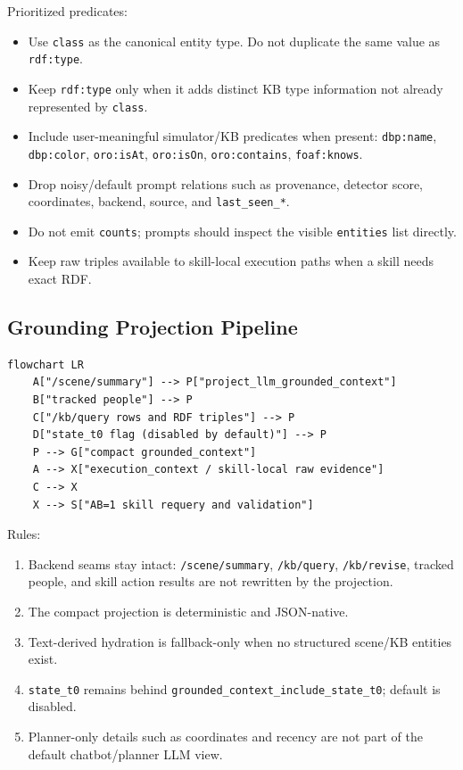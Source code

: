 \documentclass[12pt,a4paper]{article}
\newcommand{\code}[1]{\texttt{#1}}
\begin{document}
Prioritized predicates:

\begin{itemize}
\item Use \code{class} as the canonical entity type. Do not duplicate the same value as \code{rdf:type}.
\item Keep \code{rdf:type} only when it adds distinct KB type information not already represented by \code{class}.
\item Include user-meaningful simulator/KB predicates when present: \code{dbp:name}, \code{dbp:color}, \code{oro:isAt}, \code{oro:isOn}, \code{oro:contains}, \code{foaf:knows}.
\item Drop noisy/default prompt relations such as provenance, detector score, coordinates, backend, source, and \code{last\_seen\_*}.
\item Do not emit \code{counts}; prompts should inspect the visible \code{entities} list directly.
\item Keep raw triples available to skill-local execution paths when a skill needs exact RDF.
\end{itemize}



\subsection{Grounding Projection Pipeline}

\begin{lstlisting}[caption={Diagram source from canonical Markdown}]
flowchart LR
    A["/scene/summary"] --> P["project_llm_grounded_context"]
    B["tracked people"] --> P
    C["/kb/query rows and RDF triples"] --> P
    D["state_t0 flag (disabled by default)"] --> P
    P --> G["compact grounded_context"]
    A --> X["execution_context / skill-local raw evidence"]
    C --> X
    X --> S["AB=1 skill requery and validation"]
\end{lstlisting}

Rules:

\begin{enumerate}
\item Backend seams stay intact: \code{/scene/summary}, \code{/kb/query}, \code{/kb/revise}, tracked people, and skill action results are not rewritten by the projection.
\item The compact projection is deterministic and JSON-native.
\item Text-derived hydration is fallback-only when no structured scene/KB entities exist.
\item \code{state\_t0} remains behind \code{grounded\_context\_include\_state\_t0}; default is disabled.
\item Planner-only details such as coordinates and recency are not part of the default chatbot/planner LLM view.
\end{enumerate}
\end{document}
